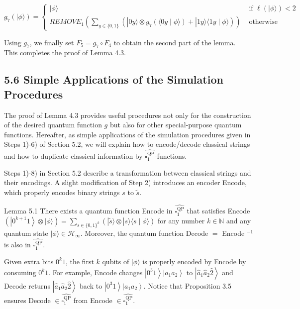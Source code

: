 \documentclass[10pt]{article}
\begin{document}
$$
g_{7}(|\phi\rangle)= \begin{cases}|\phi\rangle & \text { if } \ell(|\phi\rangle)<2 \\ R E M O V E_{1}\left(\sum_{y \in\{0,1\}}\left(|0 y\rangle \otimes g_{7}(\langle 0 y \mid \phi\rangle)+|1 y\rangle\langle 1 y \mid \phi\rangle\right)\right) & \text { otherwise }\end{cases}
$$

Using $g_{7}$, we finally set $F_{5}=g_{7} \circ F_{4}$ to obtain the second part of the lemma.\\
This completes the proof of Lemma 4.3.

\subsection*{5.6 Simple Applications of the Simulation Procedures}
The proof of Lemma 4.3 provides useful procedures not only for the construction of the desired quantum function $g$ but also for other special-purpose quantum functions. Hereafter, as simple applications of the simulation procedures given in Steps 1)-6) of Section 5.2, we will explain how to encode/decode classical strings and how to duplicate classical information by $\widehat{\square_{1}^{\mathrm{QP}}}$-functions.

Steps 1)-8) in Section 5.2 describe a transformation between classical strings and their encodings. A slight modification of Step 2) introduces an encoder Encode, which properly encodes binary strings $s$ to $\tilde{s}$.

Lemma 5.1 There exists a quantum function Encode in $\widehat{\square_{1}^{\mathrm{QP}}}$ that satisfies Encode $\left(\left|0^{k+1} 1\right\rangle \otimes|\phi\rangle\right)= \sum_{s \in\{0,1\}^{k}}(|\tilde{s}\rangle \otimes|s\rangle\langle s \mid \phi\rangle)$ for any number $k \in \mathbb{N}$ and any quantum state $|\phi\rangle \in \mathcal{H}_{\infty}$. Moreover, the quantum function Decode $=$ Encode $^{-1}$ is also in $\widehat{\square_{1}^{\mathrm{QP}}}$.

Given extra bits $0^{k} 1$, the first $k$ qubits of $|\phi\rangle$ is properly encoded by Encode by consuming $0^{k} 1$. For example, Encode changes $\left|0^{3} 1\right\rangle\left|a_{1} a_{2}\right\rangle$ to $\left|\hat{a}_{1} \hat{a}_{2} \hat{2}\right\rangle$ and Decode returns $\left|\hat{a}_{1} \hat{a}_{2} \hat{2}\right\rangle$ back to $\left|0^{3} 1\right\rangle\left|a_{1} a_{2}\right\rangle$. Notice that Proposition 3.5 ensures Decode $\in \widehat{\square_{1}^{\mathrm{QP}}}$ from Encode $\in \widehat{\square_{1}^{\mathrm{QP}}}$.
\end{document}
